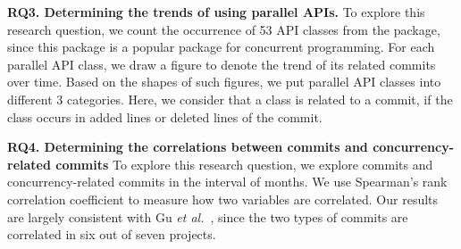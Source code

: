 \textbf{RQ3. Determining the trends of using parallel APIs.} To explore this research question, we count the occurrence of 53 API classes from the  package, since this package is a popular package for concurrent programming. For each parallel API class, we draw a figure to denote the trend of its related commits over time. Based on the shapes of such figures, we put parallel API classes into different 3 categories. Here, we consider that a class is related to a commit, if the class occurs in added lines or deleted lines of the commit.%

\textbf{RQ4. Determining the correlations between commits and concurrency-related commits} To explore this research question, we explore commits and concurrency-related commits in the interval of months. We use Spearman's rank correlation coefficient to measure how two variables are correlated. Our results are largely consistent with Gu \emph{et al.}~\cite{conf/sigsoft/GuJSZL15}, since the two types of commits are correlated in six out of seven projects.%




